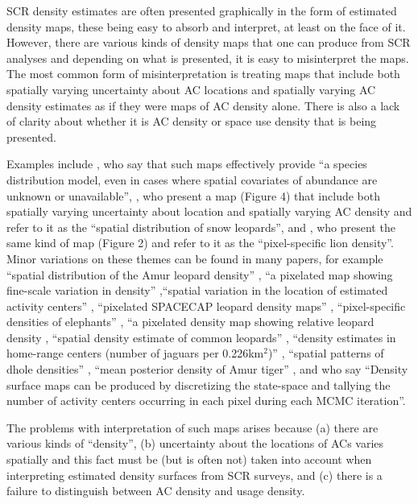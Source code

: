 \documentclass[useAMS,usenatbib,referee]{biom}
\begin{document}
SCR density estimates are often presented graphically in the form of estimated density maps, these being easy to absorb and interpret, at least on the face of it.  However, there are various kinds of density maps that one can produce from SCR analyses and depending on what is presented, it is easy to misinterpret the maps. The most common form of misinterpretation is treating maps that include both spatially varying uncertainty about AC locations and spatially varying AC density estimates as if they were maps of AC density alone. There is also a lack of clarity about whether it is AC density or space use density that is being presented.

Examples include \cite{Dorazio+Karanth:17}, who say that such maps effectively provide  ``a species distribution model, even in cases where spatial covariates of abundance are unknown or unavailable'', \cite{Alexander+al:15}, who present a map (Figure 4) that include both spatially varying uncertainty about location and spatially varying AC density and refer to it as the ``spatial distribution of snow leopards'', and \cite{Elliot+Gopalaswamy:16}, who present the same kind of map (Figure 2) and refer to it as the ``pixel-specific lion density''. Minor variations on these themes can be found in many papers, for example ``spatial distribution of the Amur leopard density'' \citep{Qi2015}, ``a pixelated map showing fine-scale variation in density'' \citep{Fouche2020},``spatial variation in the location of estimated activity centers'' \citep{Blanc2013}, ``pixelated SPACECAP leopard density maps'' \citep{Devens2021}, ``pixel-specific densities of elephants'' \citep{Goswami2019}, ``a pixelated density map showing relative leopard density \citep{Kandel2020}, ``spatial density estimate of common leopards'' \citep{Goldberg2015}, ``density estimates in home-range centers (number of jaguars per 0.226km$^2$)'' \citep{Lavariega2020}, ``spatial patterns of dhole densities'' \citep{Srivathsa2021}, ``mean posterior density of Amur tiger'' \citep{Xiao2016}, and \cite{Chandler+Royle:13} who say ``Density surface maps can be produced by discretizing the state-space and tallying the number of activity centers occurring in each pixel during each MCMC iteration''.

The problems with interpretation of such maps arises because (a) there are various kinds of ``density'', (b) uncertainty about the locations of ACs varies spatially and this fact must be (but is often not) taken into account when interpreting estimated density surfaces from SCR surveys, and (c) there is a failure to distinguish between AC density and usage density.
\end{document}
